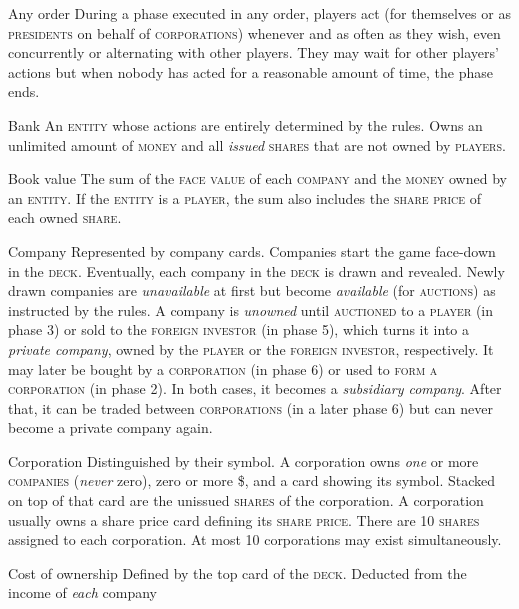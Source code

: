 \documentclass[11pt,a4paper]{article}
\newenvironment{my_description}
  {\begin{list}{}{\setlength{\labelwidth}{0pt}
   \leftmargin=1.2em
   \setlength{\itemindent}{-\leftmargin}
   \renewcommand{\makelabel}{\descriptionlabel}}
  \setlength{\itemsep}{1pt}
  \setlength{\parskip}{0pt}
  \setlength{\parsep}{0pt}
  }
  {\end{list}}
\begin{document}
\begin{multicols}{2}
{\begin{my_description}
\item[Any order] During a phase executed in any order, players act (for
  themselves or as \textsc{presidents} on behalf of
  \textsc{corporations}) whenever and as often as they wish, even
  concurrently or alternating with other players. They may wait for
  other players' actions but when nobody has acted for a reasonable
  amount of time, the phase ends.
\item[Bank] An \textsc{entity} whose actions are entirely determined
  by the rules. Owns an unlimited amount of \textsc{money} and all
  \emph{issued} \textsc{shares} that are not owned by
  \textsc{players}.
\item[Book value] The sum of the \textsc{face value} of each
  \textsc{company} and the \textsc{money} owned by an
  \textsc{entity}. If the \textsc{entity} is a \textsc{player}, the
  sum also includes the \textsc{share price} of each owned
  \textsc{share}.
\item[Company] Represented by company cards. Companies start the game
  face-down in the \textsc{deck}. Eventually, each company in the
  \textsc{deck} is drawn and revealed. Newly drawn companies are
  \emph{unavailable} at first but become \emph{available} (for
  \textsc{auctions}) as instructed by the rules. A company is
  \emph{unowned} until \textsc{auctioned} to a \textsc{player} (in
  phase 3) or sold to the \textsc{foreign investor} (in phase 5),
  which turns it into a \emph{private company}, owned by the
  \textsc{player} or the \textsc{foreign investor}, respectively. It
  may later be bought by a \textsc{corporation} (in phase 6) or used
  to \textsc{form a corporation} (in phase 2). In both cases, it
  becomes a \emph{subsidiary company}. After that, it can be traded
  between \textsc{corporations} (in a later phase 6) but can never
  become a private company again.
\item[Corporation] Distinguished by their symbol. A corporation owns
  \emph{one} or more \textsc{companies} (\emph{never} zero), zero or
  more \$, and a card showing its symbol. Stacked on top of that card
  are the unissued \textsc{shares} of the corporation. A corporation
  usually owns a share price card defining its \textsc{share
    price}. There are 10 \textsc{shares} assigned to each
  corporation. At most 10 corporations may exist simultaneously.
\item[Cost of ownership] Defined by the top card of the
  \textsc{deck}. Deducted from the income of \emph{each} company

\end{my_description}}
\end{multicols}
\end{document}
